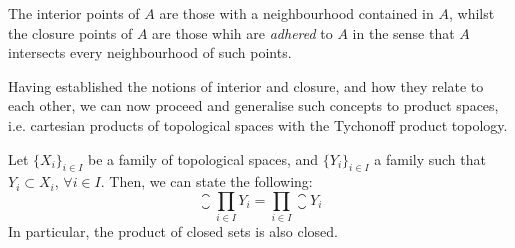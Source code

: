 \begin{remark}
	The interior points of $A$ are those with a neighbourhood contained in $A$, whilst the closure points of $A$ are those whih are \emph{adhered} to $A$ in the sense that $A$ intersects every neighbourhood of such points.
\end{remark}

Having established the notions of interior and closure, and how they relate to each other, we can now proceed and generalise such concepts to product spaces, i.e. cartesian products of topological spaces with the Tychonoff product topology.

\begin{theorem}
	\label{th:closure-product-space}
	Let $\{X_i\}_{i\in I}$ be a family of topological spaces, and $\{Y_i\}_{i\in I}$ a family such that $Y_i\subset X_i$, $\forall i\in I$. Then, we can state the following:
	\[\closure{\prod_{i\in I}Y_i}=\prod_{i\in I}\closure{Y_i}\]
	In particular, the product of closed sets is also closed.
\end{theorem}

